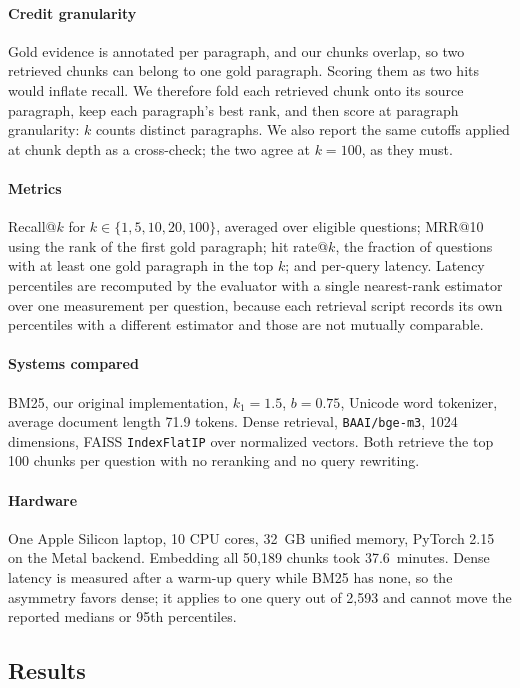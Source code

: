 \documentclass[sigconf,nonacm]{acmart}
\begin{document}
\paragraph{Credit granularity} Gold evidence is annotated per paragraph, and our
chunks overlap, so two retrieved chunks can belong to one gold paragraph.
Scoring them as two hits would inflate recall. We therefore fold each retrieved
chunk onto its source paragraph, keep each paragraph's best rank, and then score
at paragraph granularity: $k$ counts distinct paragraphs. We also report the same
cutoffs applied at chunk depth as a cross-check; the two agree at $k = 100$, as
they must.

\paragraph{Metrics} Recall@$k$ for $k \in \{1, 5, 10, 20, 100\}$, averaged over
eligible questions; MRR@10 using the rank of the first gold paragraph; hit
rate@$k$, the fraction of questions with at least one gold paragraph in the top
$k$; and per-query latency. Latency percentiles are recomputed by the evaluator
with a single nearest-rank estimator over one measurement per question, because
each retrieval script records its own percentiles with a different estimator and
those are not mutually comparable.

\paragraph{Systems compared} BM25, our original implementation, $k_1 = 1.5$,
$b = 0.75$, Unicode word tokenizer, average document length 71.9 tokens. Dense
retrieval, \texttt{BAAI/bge-m3}, 1024 dimensions, FAISS \texttt{IndexFlatIP}
over normalized vectors. Both retrieve the top 100 chunks per question with no
reranking and no query rewriting.

\paragraph{Hardware} One Apple Silicon laptop, 10 CPU cores, 32~GB unified
memory, PyTorch 2.15 on the Metal backend. Embedding all 50{,}189 chunks took
37.6~minutes. Dense latency is measured after a warm-up query while BM25 has
none, so the asymmetry favors dense; it applies to one query out of 2{,}593 and
cannot move the reported medians or 95th percentiles.

\subsection{Results}
\end{document}
